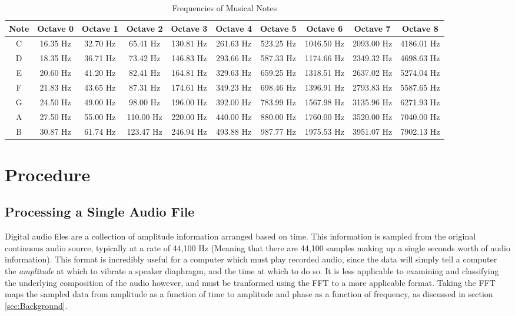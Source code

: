 \documentclass[conference]{IEEEtran}
\begin{document}
\begin{table}[h]
  \centering
  \begin{tabular}{|c|*{9}{c|}}
    \hline
    Note & Octave 0 & Octave 1 & Octave 2 & Octave 3 & Octave 4 & Octave 5 & Octave 6 & Octave 7 & Octave 8 \\
    \hline
    C & 16.35 Hz & 32.70 Hz & 65.41 Hz & 130.81 Hz & 261.63 Hz & 523.25 Hz & 1046.50 Hz & 2093.00 Hz & 4186.01 Hz \\
    D & 18.35 Hz & 36.71 Hz & 73.42 Hz & 146.83 Hz & 293.66 Hz & 587.33 Hz & 1174.66 Hz & 2349.32 Hz & 4698.63 Hz \\
    E & 20.60 Hz & 41.20 Hz & 82.41 Hz & 164.81 Hz & 329.63 Hz & 659.25 Hz & 1318.51 Hz & 2637.02 Hz & 5274.04 Hz \\
    F & 21.83 Hz & 43.65 Hz & 87.31 Hz & 174.61 Hz & 349.23 Hz & 698.46 Hz & 1396.91 Hz & 2793.83 Hz & 5587.65 Hz \\
    G & 24.50 Hz & 49.00 Hz & 98.00 Hz & 196.00 Hz & 392.00 Hz & 783.99 Hz & 1567.98 Hz & 3135.96 Hz & 6271.93 Hz \\
    A & 27.50 Hz & 55.00 Hz & 110.00 Hz & 220.00 Hz & 440.00 Hz & 880.00 Hz & 1760.00 Hz & 3520.00 Hz & 7040.00 Hz \\
    B & 30.87 Hz & 61.74 Hz & 123.47 Hz & 246.94 Hz & 493.88 Hz & 987.77 Hz & 1975.53 Hz & 3951.07 Hz & 7902.13 Hz \\
    \hline
  \end{tabular}
  \caption{Frequencies of Musical Notes}
  \label{tab:music_notes}
\end{table}

\section{Procedure}\label{sec:Procedure}

\subsection{Processing a Single Audio File}\label{sec:processing}
Digital audio files are a collection of amplitude information arranged based on time. This information is sampled from the original continuous audio source, typically at a rate of 44,100 Hz (Meaning that there are 44,100 samples making up a single seconds worth of audio information). This format is incredibly useful for a computer which must play recorded audio, since the data will simply tell a computer the \textit{amplitude} at which to vibrate a speaker diaphragm, and the time at which to do so. It is less applicable to examining and classifying the underlying composition of the audio however, and must be tranformed using the FFT to a more applicable format. Taking the FFT maps the sampled data from amplitude as a function of time to amplitude and phase as a function of frequency, as discussed in section \eqref{sec:Background}.
\end{document}
